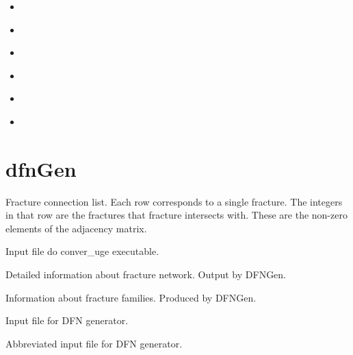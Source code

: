 \documentclass[letterpaper,10pt,english]{sphinxmanual}
\begin{document}
\begin{itemize}
\item {} 
{\hyperref[\detokenize{output:pboundary-back-n-ex}]{}}

\item {} 
{\hyperref[\detokenize{output:pboundary-bottom-ex}]{}}

\item {} 
{\hyperref[\detokenize{output:pboundary-front-s-ex}]{}}

\item {} 
{\hyperref[\detokenize{output:pboundary-left-w-ex}]{}}

\item {} 
{\hyperref[\detokenize{output:pboundary-right-e-ex}]{}}

\item {} 
{\hyperref[\detokenize{output:pboundary-top-ex}]{}}

\end{itemize}


\section{dfnGen}
\label{\detokenize{output:id1}}
\label{\detokenize{output:connectivity-dat}}
Fracture connection list. Each row corresponds to a single fracture. The integers in that row are the fractures that fracture intersects with. These are the non-zero elements of the adjacency matrix.

\label{\detokenize{output:convert-uge-params-txt}}
Input file do conver\_uge executable.

\label{\detokenize{output:dfn-output-txt}}
Detailed information about fracture network. Output by DFNGen.

\label{\detokenize{output:families-dat}}
Information about fracture families. Produced by DFNGen.

\label{\detokenize{output:input-generator-dat}}
Input file for DFN generator.

\label{\detokenize{output:input-generator-clean-dat}}
Abbreviated input file for DFN generator.
\end{document}
